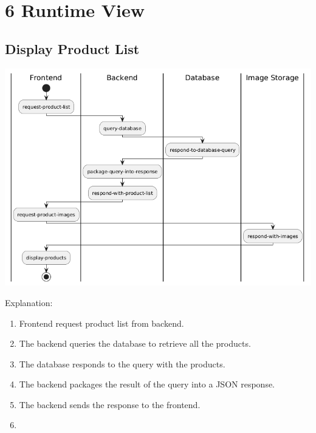 \hypertarget{section-runtime-view}{%
\section{6 Runtime View}\label{section-runtime-view}}

\hypertarget{__runtime_scenario_1}{%
\subsection{Display Product List}\label{__runtime_scenario_1}}
\includegraphics{images/uml_swimlane_product_list.png}

Explanation:
\begin{enumerate}
  \item Frontend request product list from backend.
  \item The backend queries the database to retrieve all the products.
  \item The database responds to the query with the products.
  \item The backend packages the result of the query into a JSON response.
  \item The backend sends the response to the frontend.
  \item 
\end{enumerate}


